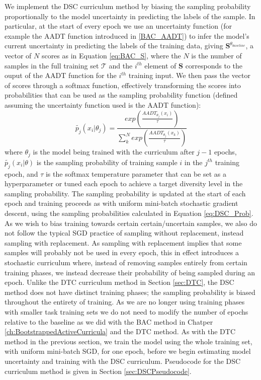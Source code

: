 We implement the DSC curriculum method by biasing the sampling probability proportionally to the model uncertainty in predicting the labels of the sample. In particular, at the start of every epoch we use an uncertainty function (for example the AADT function introduced in \ref{BAC_AADT}) to infer the model's current uncertainty in predicting the labels of the training data, giving $\mathbf{S}^{\theta_{baseline}}$, a vector of $N$ scores as in Equation \ref{eq:BAC_S}, where the $N$ is the number of samples in the full training set $\mathcal{T}$ and the $i^{th}$ element of $\mathbf{S}$ corresponds to the ouput of the AADT function for the $i^{th}$ training input. We then pass the vector of scores through a softmax function, effectively transforming the scores into probabilities that can be used as the sampling probability function (defined assuming the uncertainty function used is the AADT function):
\begin{equation}\label{eq:DSC_Prob}
\tilde{p_j}(x_i | \theta_j) = \frac{exp(\frac{AADT_{\theta_j}(x_i)}{\tau})}{\sum_{k}^{N} exp(\frac{AADT_{\theta_j}(x_k)}{\tau})}
\end{equation}
where $\theta_j$ is the model being trained with the curriculum after $j-1$ epochs, $\tilde{p_j}(x_i | \theta)$ is the sampling probability of training sample $i$ in the $j^{th}$ training epoch, and $\tau$ is the softmax temperature parameter that can be set as a hyperparameter or tuned each epoch to achieve a target diversity level in the sampling probability. The sampling probability is updated at the start of each epoch and training proceeds as with uniform mini-batch stochastic gradient descent, using the sampling probabilities calculated in Equation \ref{eq:DSC_Prob}. As we wish to bias training towards certain certain/uncertain samples, we also do not follow the typical SGD practice of sampling without replacement, instead sampling with replacement. As sampling with replacement implies that some samples will probably not be used in every epoch, this in effect introduces a stochastic curriculum where, instead of removing samples entirely from certain training phases, we instead decrease their probability of being sampled during an epoch. Unlike the DTC curriculum method in Section \ref{sec:DTC}, the DSC method does not have distinct training phases; the sampling probability is biased throughout the entirety of training. As we are no longer using training phases with smaller task training sets we do not need to modify the number of epochs relative to the baseline as we did with the BAC method in Chatper \ref{ch:BootstrappedActiveCurricula} and the DTC method. As with the DTC method in the previous section, we train the model using the whole training set, with uniform mini-batch SGD, for one epoch, before we begin estimating model uncertainty and training with the DSC curriculum. Pseudocode for the DSC curriculum method is given in Section \ref{sec:DSCPseudocode}.

